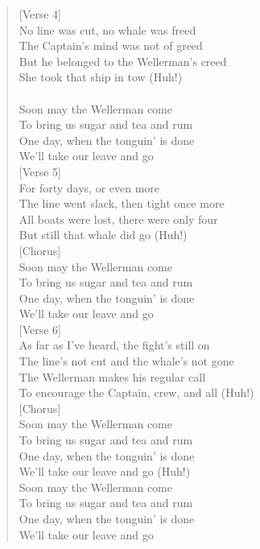 \documentclass[11pt]{article}
\begin{document}
\begin{verse}
\vspace*{1em}
[Verse 4]\\
No line was cut, no whale was freed\\
The Captain's mind was not of greed\\
But he belonged to the Wellerman's creed\\
She took that ship in tow (Huh!)\\
[Chorus]\\
Soon may the Wellerman come\\
To bring us sugar and tea and rum\\
One day, when the tonguin' is done\\
We'll take our leave and go\\
\vspace*{1em}
[Verse 5]\\
For forty days, or even more\\
The line went slack, then tight once more\\
All boats were lost, there were only four\\
But still that whale did go (Huh!)\\
\vspace*{1em}
[Chorus]\\
Soon may the Wellerman come\\
To bring us sugar and tea and rum\\
One day, when the tonguin' is done\\
We'll take our leave and go\\
\vspace*{1em}
[Verse 6]\\
As far as I've heard, the fight's still on\\
The line's not cut and the whale's not gone\\
The Wellerman makes his regular call\\
To encourage the Captain, crew, and all (Huh!)\\
\vspace*{1em}
[Chorus]\\
Soon may the Wellerman come\\
To bring us sugar and tea and rum\\
One day, when the tonguin' is done\\
We'll take our leave and go (Huh!)\\
Soon may the Wellerman come\\
To bring us sugar and tea and rum\\
One day, when the tonguin' is done\\
We'll take our leave and go\\
\end{verse}
\end{document}
